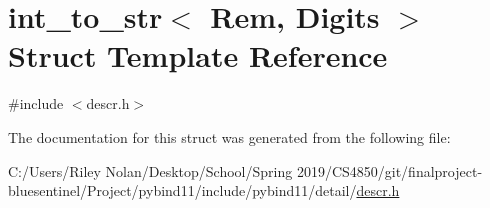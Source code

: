 \hypertarget{structint__to__str}{}\section{int\+\_\+to\+\_\+str$<$ Rem, Digits $>$ Struct Template Reference}
\label{structint__to__str}


{\ttfamily \#include $<$descr.\+h$>$}



The documentation for this struct was generated from the following file\+:\begin{DoxyCompactItemize}
\item 
C\+:/\+Users/\+Riley Nolan/\+Desktop/\+School/\+Spring 2019/\+C\+S4850/git/finalproject-\/bluesentinel/\+Project/pybind11/include/pybind11/detail/\mbox{\hyperlink{descr_8h}{descr.\+h}}\end{DoxyCompactItemize}
